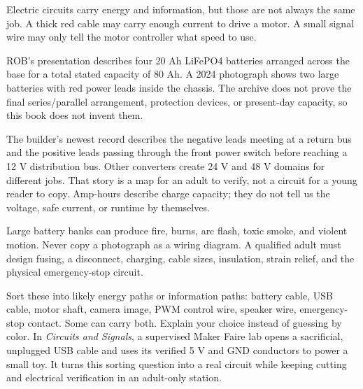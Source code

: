 \documentclass[11pt,openany]{book}
\begin{document}
Electric circuits carry energy and information, but those are not always the same job. A thick red cable may carry enough current to drive a motor. A small signal wire may only tell the motor controller what speed to use.

ROB's presentation describes four 20 Ah LiFePO4 batteries arranged across the base for a total stated capacity of 80 Ah. A 2024 photograph shows two large batteries with red power leads inside the chassis. The archive does not prove the final series/parallel arrangement, protection devices, or present-day capacity, so this book does not invent them.

The builder's newest record describes the negative leads meeting at a return bus and the positive leads passing through the front power switch before reaching a 12 V distribution bus. Other converters create 24 V and 48 V domains for different jobs. That story is a map for an adult to verify, not a circuit for a young reader to copy. Amp-hours describe charge capacity; they do not tell us the voltage, safe current, or runtime by themselves.

\begin{safetybox}
Large battery banks can produce fire, burns, arc flash, toxic smoke, and violent motion. Never copy a photograph as a wiring diagram. A qualified adult must design fusing, a disconnect, charging, cable sizes, insulation, strain relief, and the physical emergency-stop circuit.
\end{safetybox}


\begin{missionbox}[title={ENERGY OR MESSAGE?}]
Sort these into likely energy paths or information paths: battery cable, USB cable, motor shaft, camera image, PWM control wire, speaker wire, emergency-stop contact. Some can carry both. Explain your choice instead of guessing by color. In \emph{Circuits and Signals}, a supervised Maker Faire lab opens a sacrificial, unplugged USB cable and uses its verified 5 V and GND conductors to power a small toy. It turns this sorting question into a real circuit while keeping cutting and electrical verification in an adult-only station.
\end{missionbox}

\end{document}
